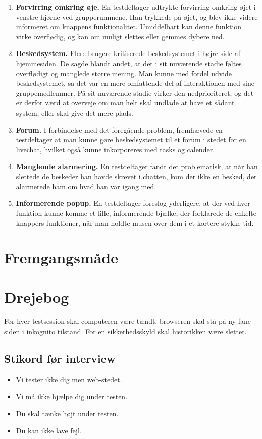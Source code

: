 \documentclass[12pt]{article}
\begin{document}
\begin{enumerate}
  \item \textbf{Forvirring omkring øje.} En testdeltager udtrykte forvirring omkring øjet i venstre hjørne ved grupperummene. Han trykkede på øjet, og blev ikke videre informeret om knappens funktionalitet. Umiddelbart kan denne funktion virke overflødig, og kan om muligt slettes eller gemmes dybere ned.

  \item \textbf{Beskedsystem.} Flere brugere kritiserede beskedsystemet i højre side af hjemmesiden. De sagde blandt andet, at det i sit nuværende stadie føltes overflødigt og manglede større mening. Man kunne med fordel udvide beskedsystemet, så det var en mere omfattende del af interaktionen med sine gruppemedlemmer. På sit nuværende stadie virker den nedprioriteret, og det er derfor værd at overveje om man helt skal undlade at have et sådant system, eller skal give det mere plads.

  \item \textbf{Forum.} I forbindelse med det foregående problem, fremhævede en testdeltager at man kunne gøre beskedsystemet til et forum i stedet for en livechat, hvilket også kunne inkorporeres med tasks og calender.
  
  \item \textbf{Manglende alarmering.} En testdeltager fandt det problematisk, at når han slettede de beskeder han havde skrevet i chatten, kom der ikke en besked, der alarmerede ham om hvad han var igang med.
  
  \item \textbf{Informerende popup.} En testdeltager foreslog yderligere, at der ved hver funktion kunne komme et lille, informerende bjælke, der forklarede de enkelte knappers funktioner, når man holdte musen over dem i et kortere stykke tid.
\end{enumerate}

\section{Fremgangsmåde}

\section{Drejebog}
Før hver testsession skal computeren være tændt, browseren skal stå på ny fane siden i inkognito tilstand. For en sikkerhedsskyld skal historikken være slettet.
\subsection{Stikord før interview}
\begin{itemize}
\item Vi tester ikke dig men web-stedet.
\item Vi må ikke hjælpe dig under testen.
\item Du skal tænke højt under testen.
\item Du kan ikke lave fejl.
\end{itemize}
\end{document}
